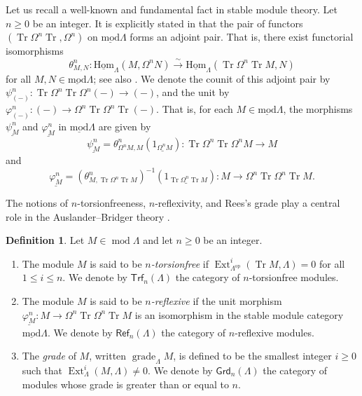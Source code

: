 \documentclass{amsart}
\theoremstyle{definition}
\newtheorem{dfn}[thm]{Definition}
\theoremstyle{remark}
\numberwithin{equation}{thm}
\def\Ext{\operatorname{Ext}}
\def\ge{\geqslant}
\def\grade{\operatorname{grade}}
\def\grd{\mathsf{Grd}}
\def\le{\leqslant}
\def\lhom{\operatorname{\underline{Hom}}}
\def\lmod{\operatorname{\underline{mod}}}
\def\mod{\operatorname{mod}}
\def\refl{\mathsf{Ref}}
\def\syz{\Omega}
\def\Trf{\mathsf{Trf}}
\def\tr{\operatorname{Tr}}
\begin{document}
Let us recall a well-known and fundamental fact in stable module theory.  
Let $n \ge 0$ be an integer.  
It is explicitly stated in \cite[Corollary 3.4]{AR2} that the pair of functors $(\tr \syz^n \tr, \syz^n)$ on $\lmod\Lambda$ forms an adjoint pair.  
That is, there exist functorial isomorphisms
$$
\theta^n_{M, N} : \lhom_{\Lambda}(M, \syz^n N) \xrightarrow{\sim} \lhom_\Lambda(\tr \syz^n \tr M, N)
$$
for all $M, N \in \lmod\Lambda$; see also \cite{AB, GT, Omorp}.
We denote the counit of this adjoint pair by $\psi^n_{(-)} : \tr \syz^n \tr \syz^n(-) \to (-)$, and the unit by $\varphi^n_{(-)} : (-) \to \syz^n \tr \syz^n \tr(-)$.
That is, for each $M \in \lmod\Lambda$, the morphisms $\underline{\psi^n_M}$ and $\underline{\varphi^n_M}$ in $\lmod\Lambda$ are given by
$$
\underline{\psi^n_M} = \theta^n_{\syz^n M, M}(\underline{1_{\syz^n M}}) : \tr \syz^n \tr \syz^n M \to M
$$
and
$$
\underline{\varphi^n_M} = \left(\theta^n_{M, \tr \syz^n \tr M}\right)^{-1}(\underline{1_{\tr \syz^n \tr M}}) : M \to \syz^n \tr \syz^n \tr M.
$$

The notions of $n$-torsionfreeness, $n$-reflexivity, and Rees's grade play a central role in the Auslander--Bridger theory \cite{AB}.

\begin{dfn}
Let $M \in \mod\Lambda$ and let $n \ge 0$ be an integer.
\begin{enumerate}[\rm(1)]
  \item
  The module $M$ is said to be {\em $n$-torsionfree} if $\Ext^i_{\Lambda^{\mathrm{op}}}(\tr M, \Lambda) = 0$ for all $1 \le i \le n$.
  We denote by $\Trf_n(\Lambda)$ the category of $n$-torsionfree modules.
  \item
  The module $M$ is said to be {\em $n$-reflexive} if the unit morphism $\underline{\varphi^n_M} : M \to \syz^n \tr \syz^n \tr M$ is an isomorphism in the stable module category $\lmod\Lambda$.
  We denote by $\refl_n(\Lambda)$ the category of $n$-reflexive modules.
  \item
  The {\em grade} of $M$, written $\grade_\Lambda M$, is defined to be the smallest integer $i \ge 0$ such that $\Ext^i_{\Lambda}(M, \Lambda) \ne 0$.
  We denote by $\grd_n(\Lambda)$ the category of modules whose grade is greater than or equal to $n$.
\end{enumerate}
\end{dfn}
\end{document}
